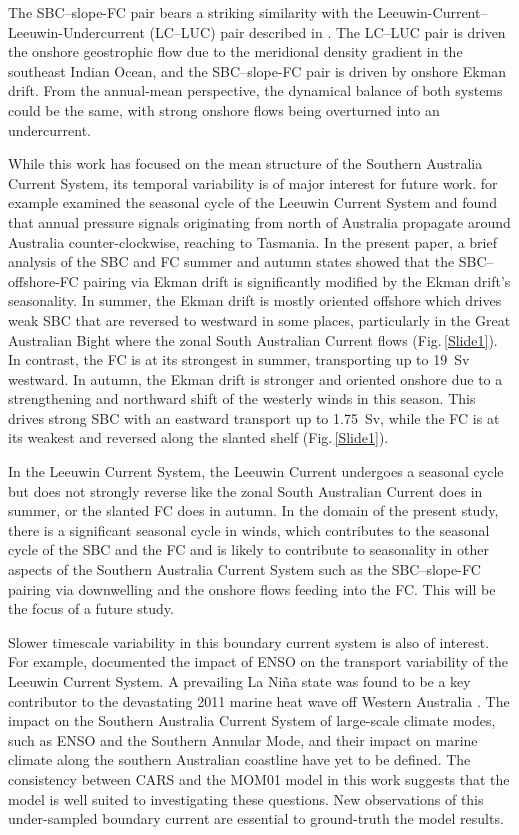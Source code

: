 \documentclass[preprint,3p,review,12pt]{elsarticle}
\begin{document}
The SBC--slope-FC pair bears a striking similarity with the Leeuwin-Current--Leeuwin-Undercurrent (LC--LUC) pair described in \citet{Furue2017}. The LC--LUC pair is driven the onshore geostrophic flow due to the meridional density gradient in the southeast Indian Ocean, and the SBC--slope-FC pair is driven by onshore Ekman drift. From the annual-mean perspective, the dynamical balance of both systems could be the same, with strong onshore flows being overturned into an undercurrent.

While this work has focused on the mean structure of the Southern Australia Current System, its temporal variability is of major interest for future work. \citet{Ridgway2015} for example examined the seasonal cycle of the Leeuwin Current System and found that annual pressure signals originating from north of Australia propagate around Australia counter-clockwise, reaching to Tasmania. In the present paper, a brief analysis of the SBC and FC summer and autumn states showed that the SBC--offshore-FC pairing via Ekman drift is significantly modified by the Ekman drift's seasonality. In summer, the Ekman drift is mostly oriented offshore which drives weak SBC that are reversed to westward in some places, particularly in the Great Australian Bight where the zonal South Australian Current flows (Fig.\,\ref{Slide1}). In contrast, the FC is at its strongest in summer, transporting up to \SI{19}{Sv} westward. In autumn, the Ekman drift is stronger and oriented onshore due to a strengthening and northward shift of the westerly winds in this season. This drives strong SBC with an eastward transport up to \SI{1.75}{Sv}, while the FC is at its weakest and reversed along the slanted shelf (Fig.\,\ref{Slide1}). 

In the Leeuwin Current System, the Leeuwin Current undergoes a seasonal cycle \citep{Ridgway2015} but does not strongly reverse like the zonal South Australian Current does in summer, or the slanted FC does in autumn. In the domain of the present study, there is a significant seasonal cycle in winds, which contributes to the seasonal cycle of the SBC and the FC and is likely to contribute to seasonality in other aspects of the Southern Australia Current System such as the SBC--slope-FC pairing via downwelling and the onshore flows feeding into the FC\@. This will be the focus of a future study. 

Slower timescale variability in this boundary current system is also of interest. For example, \citet{Feng2003} documented the impact of ENSO on the transport variability of the Leeuwin Current System. A prevailing La Ni\~na state was found to be a key contributor to the devastating 2011 marine heat wave off Western Australia \citep{Feng2013}. The impact on the Southern Australia Current System of large-scale climate modes, such as ENSO and the Southern Annular Mode, and their impact on marine climate along the southern Australian coastline have yet to be defined. The consistency between CARS and the MOM01 model in this work suggests that the model is well suited to investigating these questions. New observations of this under-sampled boundary current are essential to ground-truth the model results.
\end{document}
